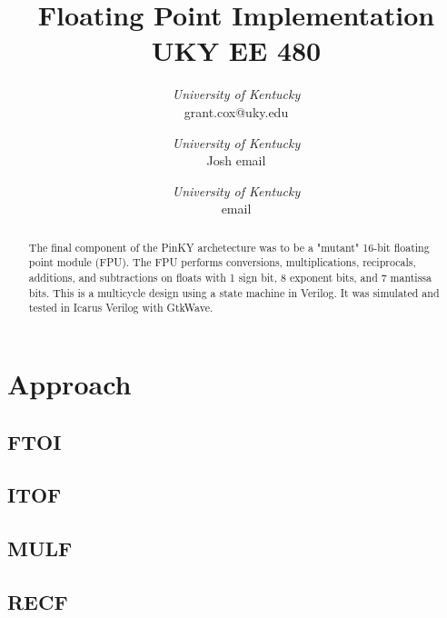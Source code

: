 \documentclass[conference]{IEEEtran}
\begin{document}
\title{Floating Point Implementation\\
    UKY EE 480}

\author{
\textit{University of Kentucky}\\
grant.cox@uky.edu
\and
{}
\textit{University of Kentucky}\\
Josh email
\and
{}
\textit{University of Kentucky}\\
email}

\maketitle




\begin{abstract}
    The final component of the PinKY archetecture was to be a "mutant" 16-bit floating point module (FPU). The FPU performs conversions, multiplications, reciprocals, additions, and subtractions on floats with 1 sign bit, 8 exponent bits, and 7 mantissa bits. This is a multicycle design using a state machine in Verilog. It was simulated and tested in Icarus Verilog with GtkWave.
\end{abstract}

\section{Approach}
    \subsection{FTOI}
    \subsection{ITOF}
    \subsection{MULF}
    \subsection{RECF}
\end{document}
